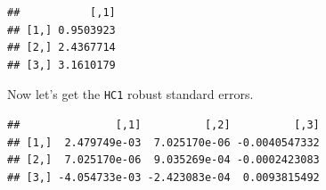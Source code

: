 \documentclass[]{article}
\newenvironment{Shaded}{\begin{snugshade}}{\end{snugshade}}
\newcommand{\CommentTok}[1]{\textcolor[rgb]{0.56,0.35,0.01}{\textit{#1}}}
\newcommand{\DecValTok}[1]{\textcolor[rgb]{0.00,0.00,0.81}{#1}}
\newcommand{\KeywordTok}[1]{\textcolor[rgb]{0.13,0.29,0.53}{\textbf{#1}}}
\newcommand{\NormalTok}[1]{#1}
\newcommand{\OperatorTok}[1]{\textcolor[rgb]{0.81,0.36,0.00}{\textbf{#1}}}
\newcommand{\StringTok}[1]{\textcolor[rgb]{0.31,0.60,0.02}{#1}}
\begin{document}
\begin{verbatim}
##           [,1]
## [1,] 0.9503923
## [2,] 2.4367714
## [3,] 3.1610179
\end{verbatim}

Now let's get the \texttt{HC1} robust standard errors.

\begin{Shaded}
\end{Shaded}

\begin{verbatim}
##               [,1]          [,2]          [,3]
## [1,]  2.479749e-03  7.025170e-06 -0.0040547332
## [2,]  7.025170e-06  9.035269e-04 -0.0002423083
## [3,] -4.054733e-03 -2.423083e-04  0.0093815492
\end{verbatim}

\begin{Shaded}
\end{Shaded}
\end{document}

